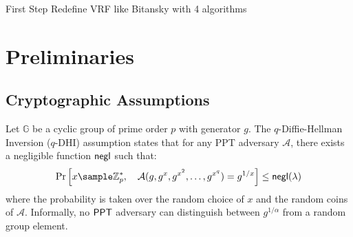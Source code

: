 First Step
Redefine VRF like Bitansky with 4 algorithms



















































































\section{Preliminaries}
\subsection{Cryptographic Assumptions}

\begin{definition}
Let $\mathbb{G}$ be a cyclic group of prime order $p$ with generator $g$. The $q$-Diffie-Hellman Inversion ($q$-DHI) assumption \cite{mitsunari_new_2002} states that for any PPT adversary $\mathcal{A}$, there exists a negligible function $\mathsf{negl}$ such that:
\[
\Pr\left[ x \sample \Zp^*, \quad \mathcal{A}(g, g^x, g^{x^2}, \ldots, g^{x^q}) = g^{1/x} \right] \leq \negl(\lambda)
\]
where the probability is taken over the random choice of $x$ and the random coins of $\mathcal{A}$. Informally, no $\mathsf{PPT}$ adversary can distinguish between $g^{1/\alpha}$ from a random group element.
\end{definition}

